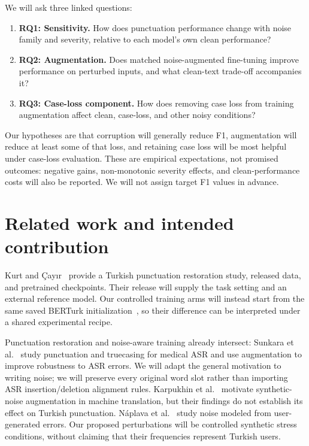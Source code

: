 \documentclass{article}
\begin{document}
We will ask three linked questions:
\begin{enumerate}
\item \textbf{RQ1: Sensitivity.} How does punctuation performance change with
noise family and severity, relative to each model's own clean performance?
\item \textbf{RQ2: Augmentation.} Does matched noise-augmented fine-tuning improve
performance on perturbed inputs, and what clean-text trade-off accompanies it?
\item \textbf{RQ3: Case-loss component.} How does removing case loss from
training augmentation affect clean, case-loss, and other noisy conditions?
\end{enumerate}
Our hypotheses are that corruption will generally reduce F1, augmentation will
reduce at least some of that loss, and retaining case loss will be most helpful
under case-loss evaluation. These are empirical expectations, not promised
outcomes: negative gains, non-monotonic severity effects, and clean-performance
costs will also be reported. We will not assign target F1 values in advance.

\section{Related work and intended contribution}
Kurt and \c{C}ay\i r~\cite{kurt2023} provide a Turkish punctuation restoration
study, released data, and pretrained checkpoints. Their release will supply
the task setting and an external reference model. Our controlled training
arms will instead start from the same saved BERTurk initialization~\cite{berturk},
so their difference can be interpreted under a shared experimental recipe.

Punctuation restoration and noise-aware training already intersect:
Sunkara et al.~\cite{sunkara2020} study punctuation and truecasing for medical
ASR and use augmentation to improve robustness to ASR errors. We will adapt
the general motivation to writing noise; we will preserve every original word
slot rather than importing ASR insertion/deletion alignment rules.
Karpukhin et al.~\cite{karpukhin2019} motivate synthetic-noise augmentation in
machine translation, but their findings do not establish its effect on Turkish
punctuation. N\'{a}plava et al.~\cite{naplava2021} study noise modeled from
user-generated errors. Our proposed perturbations will be controlled synthetic
stress conditions, without claiming that their frequencies represent Turkish
users.
\end{document}
